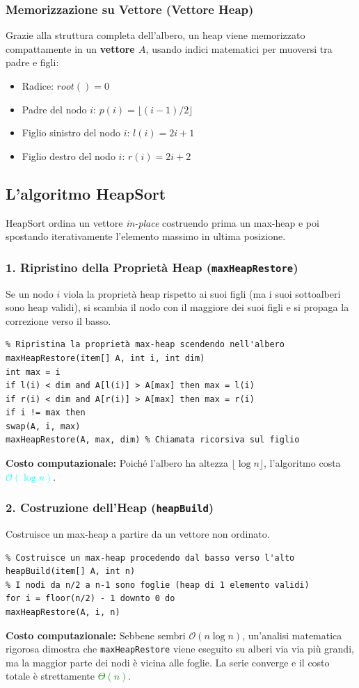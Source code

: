 \documentclass[12pt, a4paper]{article}
\begin{document}
\subsubsection{Memorizzazione su Vettore (Vettore Heap)}
Grazie alla struttura completa dell'albero, un heap viene memorizzato compattamente in un \textbf{vettore $A$}, usando indici matematici per muoversi tra padre e figli:
\begin{itemize}
\item Radice: $root() = 0$
\item Padre del nodo $i$: $p(i) = \lfloor (i-1)/2 \rfloor$
\item Figlio sinistro del nodo $i$: $l(i) = 2i + 1$
\item Figlio destro del nodo $i$: $r(i) = 2i + 2$
\end{itemize}

\subsection{L'algoritmo HeapSort}
HeapSort ordina un vettore \textit{in-place} costruendo prima un max-heap e poi spostando iterativamente l'elemento massimo in ultima posizione.

\subsubsection{1. Ripristino della Proprietà Heap (\texttt{maxHeapRestore})}
Se un nodo $i$ viola la proprietà heap rispetto ai suoi figli (ma i suoi sottoalberi sono heap validi), si scambia il nodo con il maggiore dei suoi figli e si propaga la correzione verso il basso.
\begin{verbatim}
% Ripristina la proprietà max-heap scendendo nell'albero
maxHeapRestore(item[] A, int i, int dim)
int max = i
if l(i) < dim and A[l(i)] > A[max] then max = l(i)
if r(i) < dim and A[r(i)] > A[max] then max = r(i)
if i != max then
swap(A, i, max)
maxHeapRestore(A, max, dim) % Chiamata ricorsiva sul figlio
\end{verbatim}
\textbf{Costo computazionale:} Poiché l'albero ha altezza $\lfloor \log n \rfloor$, l'algoritmo costa \textcolor{cyan}{$\mathcal{O}(\log n)$}.

\subsubsection{2. Costruzione dell'Heap (\texttt{heapBuild})}
Costruisce un max-heap a partire da un vettore non ordinato.
\begin{verbatim}
% Costruisce un max-heap procedendo dal basso verso l'alto
heapBuild(item[] A, int n)
% I nodi da n/2 a n-1 sono foglie (heap di 1 elemento validi)
for i = floor(n/2) - 1 downto 0 do
maxHeapRestore(A, i, n)
\end{verbatim}
\textbf{Costo computazionale:} Sebbene sembri $\mathcal{O}(n \log n)$, un'analisi matematica rigorosa dimostra che \texttt{maxHeapRestore} viene eseguito su alberi via via più grandi, ma la maggior parte dei nodi è vicina alle foglie. La serie converge e il costo totale è strettamente \textcolor{green}{$\Theta(n)$}.
\end{document}
